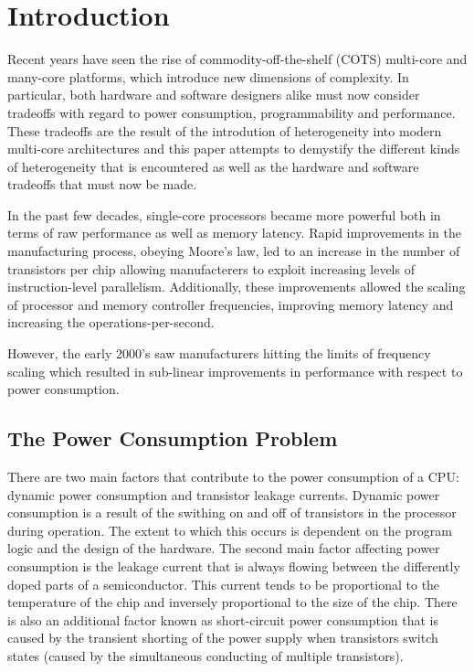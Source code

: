 \section{Introduction}



Recent years have seen the rise of commodity-off-the-shelf (COTS) multi-core and many-core platforms, which introduce new dimensions of complexity. In particular, both hardware and software designers alike must now consider tradeoffs with regard to power consumption, programmability and performance. These tradeoffs are the result of the introdution of heterogeneity into modern multi-core architectures and this paper attempts to demystify the different kinds of heterogeneity that is encountered as well as the hardware and software tradeoffs that must now be made.

In the past few decades, single-core processors became more powerful both in terms of raw performance as well as memory latency. Rapid improvements in the  manufacturing process, obeying Moore's law, led to an increase in the number of transistors per chip allowing manufacterers to exploit increasing levels of instruction-level parallelism. Additionally, these improvements allowed the scaling of processor and memory controller frequencies, improving memory latency and increasing the operations-per-second.

However, the early 2000's saw manufacturers hitting the limits of frequency scaling which resulted in sub-linear improvements in performance with respect to power consumption.

\subsection{The Power Consumption Problem}


There are two main factors that contribute to the power consumption of a CPU: dynamic power consumption and transistor leakage currents. Dynamic power consumption is a result of the swithing on and off of transistors in the processor during operation. The extent to which this occurs is dependent on the program logic and the design of the hardware. The second main factor affecting power consumption is the leakage current that is always flowing between the differently doped parts of a semiconductor. This current tends to be proportional to the temperature of the chip and inversely proportional to the size of the chip. There is also an additional factor known as short-circuit power consumption that is caused by the transient shorting of the power supply when transistors switch states (caused by the simultaneous conducting of multiple transistors). \cite{ftp://download.intel.com/design/network/papers/30117401.pdf}


